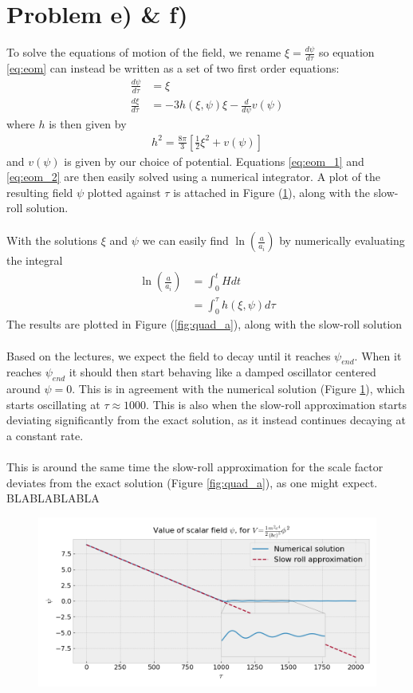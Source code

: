 \documentclass[reprint,english,notitlepage]{revtex4-1}  %
\numberwithin{equation}{section}
\begin{document}
\section{Problem e) \& f)}
To solve the equations of motion of the field, we rename
$\xi = \frac{d\psi}{d\tau}$ so equation \ref{eq:eom} can instead be written as
a set of two first order equations:
\begin{align}
	\frac{d\psi}{d\tau} &= \xi \label{eq:eom_1} \\
	\frac{d\xi}{d\tau}  &= -3h(\xi, \psi) \xi - \frac{d}{d\psi}v(\psi) \label{eq:eom_2}
\end{align}
where $h$ is then given by
\begin{align}
	h^2 = \frac{8\pi}{3}\left[ \frac{1}{2}\xi^2 + v(\psi)\right]
\end{align}
and $v(\psi)$ is given by our choice of potential. Equations \ref{eq:eom_1} and
\ref{eq:eom_2} are then easily solved using a numerical integrator. A plot of
the resulting field $\psi$ plotted against $\tau$ is attached in Figure
(\ref{fig:quad_psi}), along with the slow-roll solution.
\\ \\
With the
solutions $\xi$ and $\psi$ we can easily find $\ln\left(\frac{a}{a_i}\right)$
by numerically evaluating the integral
\begin{align}
	\ln\left(\frac{a}{a_i}\right) &= \int_0^t H dt \\
																&= \int_0^\tau h(\xi, \psi) d\tau
\end{align}
The results are plotted in Figure (\ref{fig:quad_a}), along with the slow-roll
solution
\\ \\
Based on the lectures, we expect the field to decay until it reaches $\psi_{end}$.
When it reaches $\psi_{end}$ it should then start behaving like a damped oscillator
centered around $\psi=0$. This is in agreement with the numerical solution
(Figure \ref{fig:quad_psi}), which starts oscillating at $\tau\approx 1000$.
This is also when the slow-roll approximation starts deviating significantly
from the exact solution, as it instead continues decaying at a constant rate.
\\ \\
This is around the same time the slow-roll approximation for the scale factor
deviates from the exact solution (Figure \ref{fig:quad_a}), as one might expect.
BLABLABLABLA
\begin{figure}[h!]
	\includegraphics[width=\linewidth]{QuadraticPotential_field-value.png}
	\caption{}
	\label{fig:quad_psi}
\end{figure}
\end{document}
